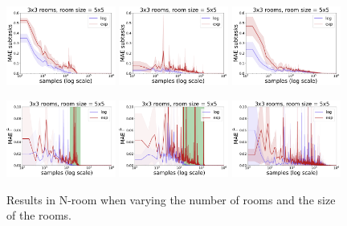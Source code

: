 \begin{figure}
  \includegraphics*[width=0.32\textwidth]{figures/chapter2/online/nrooms_3_3_subtasks.pdf}
  \includegraphics*[width=0.32\textwidth]{figures/chapter2/online/nrooms_5_5_subtasks.pdf}
  \includegraphics*[width=0.32\textwidth]{figures/chapter2/online/nrooms_8_8_subtasks.pdf}

  \includegraphics*[width=0.32\textwidth]{figures/chapter2/online/nrooms_3_3_gammas.pdf}
  \includegraphics*[width=0.32\textwidth]{figures/chapter2/online/nrooms_5_5_gammas.pdf}
  \includegraphics*[width=0.32\textwidth]{figures/chapter2/online/nrooms_8_8_gammas.pdf}


  \caption{Results in N-room when varying the number of rooms and the size of the rooms.}
  \label{fig:halmdps_nrooms}
  \end{figure}
  


